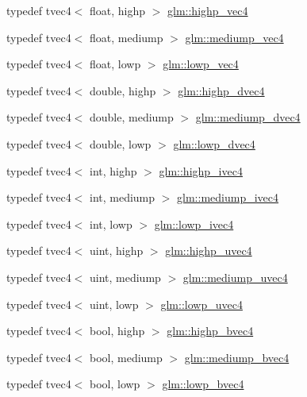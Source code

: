 \begin{DoxyCompactItemize}
\item 
typedef tvec4$<$ float, highp $>$ \hyperlink{group__core__precision_ga5f573b0132805b54cb9205eea1c86483}{glm\-::highp\-\_\-vec4}
\item 
typedef tvec4$<$ float, mediump $>$ \hyperlink{group__core__precision_ga3e0bdf70b43f0c2863ad9f0fe7da9476}{glm\-::mediump\-\_\-vec4}
\item 
typedef tvec4$<$ float, lowp $>$ \hyperlink{group__core__precision_gabb82786cbefa101e9eb0cff63cecb1f2}{glm\-::lowp\-\_\-vec4}
\item 
typedef tvec4$<$ double, highp $>$ \hyperlink{group__core__precision_ga2bb20b4bd180746b93577bc57f4b2b9d}{glm\-::highp\-\_\-dvec4}
\item 
typedef tvec4$<$ double, mediump $>$ \hyperlink{group__core__precision_gaf685121e70f851b16581c154d8b27679}{glm\-::mediump\-\_\-dvec4}
\item 
typedef tvec4$<$ double, lowp $>$ \hyperlink{group__core__precision_gaed0097453a4f8b1f3dcf7476aee881cd}{glm\-::lowp\-\_\-dvec4}
\item 
typedef tvec4$<$ int, highp $>$ \hyperlink{group__core__precision_ga9303c2a9e1f1e761961eeecbcda2d34f}{glm\-::highp\-\_\-ivec4}
\item 
typedef tvec4$<$ int, mediump $>$ \hyperlink{group__core__precision_ga687eefa63b2c9d0969227eaf23b1ad41}{glm\-::mediump\-\_\-ivec4}
\item 
typedef tvec4$<$ int, lowp $>$ \hyperlink{group__core__precision_ga863ce958bb6c85ab934feeb4a0da5821}{glm\-::lowp\-\_\-ivec4}
\item 
typedef tvec4$<$ uint, highp $>$ \hyperlink{group__core__precision_gaced82ea2e726f079d4d72cf180a75b8b}{glm\-::highp\-\_\-uvec4}
\item 
typedef tvec4$<$ uint, mediump $>$ \hyperlink{group__core__precision_ga825e1e6ef3513c5de283d1b2fa1d4879}{glm\-::mediump\-\_\-uvec4}
\item 
typedef tvec4$<$ uint, lowp $>$ \hyperlink{group__core__precision_ga5bb34ee8aba0f936bc521850819fc762}{glm\-::lowp\-\_\-uvec4}
\item 
typedef tvec4$<$ bool, highp $>$ \hyperlink{group__core__precision_ga12155cf93fb8fea5d9c4c7e2d72aed4e}{glm\-::highp\-\_\-bvec4}
\item 
typedef tvec4$<$ bool, mediump $>$ \hyperlink{group__core__precision_ga92b3f3ba6ecceaea364906ad7ee985a5}{glm\-::mediump\-\_\-bvec4}
\item 
typedef tvec4$<$ bool, lowp $>$ \hyperlink{group__core__precision_ga512926597aea7a1afe60ee7b983db86d}{glm\-::lowp\-\_\-bvec4}
\end{DoxyCompactItemize}



